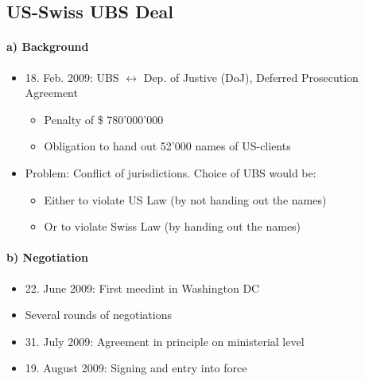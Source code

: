\subsection{US-Swiss UBS Deal}

\paragraph{a) Background}

\begin{itemize}
    \item 18. Feb. 2009: UBS $\leftrightarrow$ Dep. of Justive (DoJ),
        Deferred Prosecution Agreement
        \begin{itemize}
            \item Penalty of \$ 780'000'000
            \item Obligation to hand out 52'000 names of US-clients
        \end{itemize}
    \item Problem: Conflict of jurisdictions. Choice of UBS would be:
        \begin{itemize}
            \item Either to violate US Law (by not handing out the names)
            \item Or to violate Swiss Law (by handing out the names)
        \end{itemize}
\end{itemize}

\paragraph{b) Negotiation}

\begin{itemize}
    \item 22. June 2009: First meedint in Washington DC
    \item Several rounds of negotiations
    \item 31. July 2009: Agreement in principle on ministerial level
    \item 19. August 2009: Signing and entry into force
\end{itemize}

